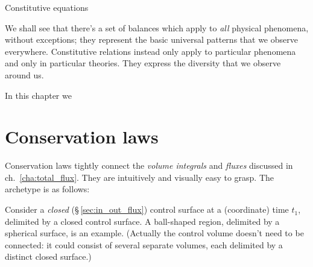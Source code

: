 \documentclass[a4paper,12pt,%
onecolumn,oneside,titlepage,%
british%
]{memoir}
\renewcommand*{\|}[1][]{\nonscript\:#1\vert\nonscript\:\mathopen{}}
\newcommand*{\sect}{\S}%
\newcommand*{\chap}{ch.}%
\begin{document}
Constitutive equations


We shall see that there's a set of balances which apply to \emph{all} physical phenomena, without exceptions; they represent the basic universal patterns that we observe everywhere. Constitutive relations instead only apply to particular phenomena and only in particular theories. They express the diversity that we observe around us.

In this chapter we

\section{Conservation laws}
\label{sec:conservation_laws}

Conservation laws tightly connect the \emph{volume integrals} and \emph{fluxes} discussed in \chap~\ref{cha:total_flux}. They are intuitively and visually easy to grasp. The archetype is as follows:

Consider a \emph{closed} (\sect\,\ref{sec:in_out_flux}) control surface at a (coordinate) time $t_{1}$, delimited by a closed control surface. A ball-shaped region, delimited by a spherical surface, is an example. (Actually the control volume doesn't need to be connected: it could consist of several separate volumes, each delimited by a distinct closed surface.)
\end{document}
